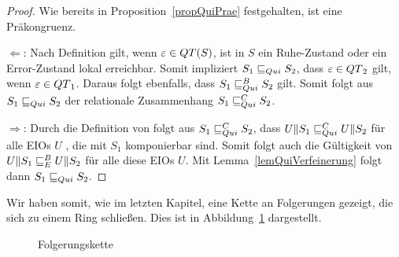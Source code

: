 \begin{proof}
  Wie bereits in Proposition~\ref{propQuiPrae} festgehalten, ist \QRel{} eine
  Präkongruenz.

  \glqq{}$\Leftarrow$\grqq{}: Nach Definition gilt, wenn
  $\varepsilon\in QT{}(S)$, ist in $S$ ein Ruhe-Zustand oder ein Error-Zustand
  lokal erreichbar. Somit impliziert $S_1\sqsubseteq _{Qui} S_2$, dass
  $\varepsilon\in QT{}_2$ gilt, wenn $\varepsilon\in QT{}_1$. Daraus folgt
  ebenfalls, dass $S_1\sqsubseteq _{Qui}^B S_2$ gilt. Somit folgt aus $S_1\sqsubseteq _{Qui} S_2$ der
  relationale Zusammenhang $S_1\sqsubseteq _{Qui}^C S_2$.

  \glqq{}$\Rightarrow$\grqq{}: Durch die Definition von \QCRel{} folgt aus
  $S_1\sqsubseteq _{Qui}^C{} S_2$, dass $U\|S_1\sqsubseteq _{Qui}^C U\|S_2$ für alle EIOs $U$ , die mit
  $S_1$ komponierbar sind. Somit folgt auch die Gültigkeit von $U\|S_1\sqsubseteq _E^B
  U\|S_2$ für alle diese EIOs $U$. Mit Lemma~\ref{lemQuiVerfeinerung} folgt
  dann $S_1\sqsubseteq _{Qui}{} S_2$.
\end{proof}

Wir haben somit, wie im letzten Kapitel, eine Kette an Folgerungen gezeigt, die
sich zu einem Ring schließen. Dies ist in Abbildung~\ref{FolgerungsketteQui}
dargestellt.

\begin{figure}[h!tbp]
  \begin{center}
    \caption{Folgerungskette}
    \label{FolgerungsketteQui}
  \end{center}
\end{figure}

